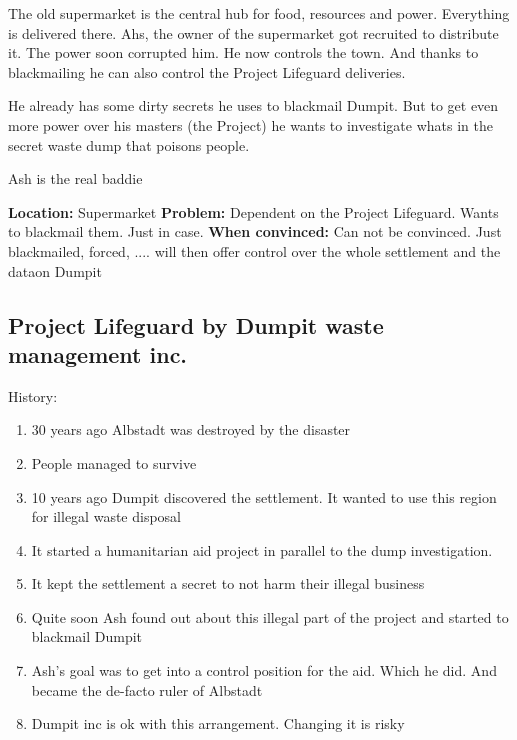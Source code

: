 \begin{npcBox}[title=Ash]
    \begin{consequences}
    \item {}
    \item {}
    \item {}
    \end{consequences}

    \begin{npcDescription}
    The old supermarket is the central hub for food, resources and power. Everything is delivered there. Ahs, the owner of the supermarket got recruited to distribute it. The power soon corrupted him. He now controls the town. And thanks to blackmailing he can also control the Project Lifeguard deliveries.

    He already has some dirty secrets he uses to blackmail Dumpit. But to get even more power over his masters (the Project) he wants to investigate whats in the secret waste dump that poisons people.

    Ash is the real baddie

    \textbf{Location:} Supermarket
    \textbf{Problem:} Dependent on the Project Lifeguard. Wants to blackmail them. Just in case.
    \textbf{When convinced:} Can not be convinced. Just blackmailed, forced, .... will then offer control over the whole settlement and the dataon Dumpit
    \end{npcDescription}

\end{npcBox}




\subsection{Project Lifeguard by Dumpit waste management inc.}

History:
\begin{enumerate}
    \item 30 years ago Albstadt was destroyed by the disaster
    \item People managed to survive
    \item 10 years ago Dumpit discovered the settlement. It wanted to use this region for illegal waste disposal
    \item It started a humanitarian aid project in parallel to the dump investigation.
    \item It kept the settlement a secret to not harm their illegal business
    \item Quite soon Ash found out about this illegal part of the project and started to blackmail Dumpit
    \item Ash's goal was to get into a control position for the aid. Which he did. And became the de-facto ruler of Albstadt
    \item Dumpit inc is ok with this arrangement. Changing it is risky
\end{enumerate}

